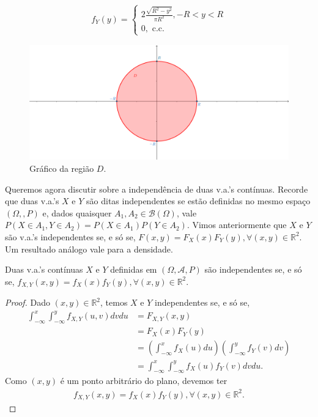 \documentclass[../Notas.tex]{subfiles}
\begin{document}
\begin{example}
\begin{align*}
    f_Y(y) = \begin{cases}
    2\frac{\sqrt{R^2 - y^2}}{\pi R^2}, -R < y < R \\
    0, \text{ c.c.}
    \end{cases}
\end{align*}
\begin{figure}[H]
    \centering
    \includegraphics[width=\textwidth]{Imagens/p121.png}
    \caption{Gráfico da região $D$.}
\end{figure}
\end{example}

Queremos agora discutir sobre a independência de duas v.a.'s contínuas. Recorde que duas v.a.'s $X$ e $Y$ são ditas independentes se estão definidas no mesmo espaço $(\Omega, \mathcal, P)$ e, dados quaisquer $A_1, A_2\in\mathcal{B}(\Omega)$, vale $P(X\in A_1, Y\in A_2) = P(X\in A_1)P(Y\in A_2)$. Vimos anteriormente que $X$ e $Y$ são v.a.'s independentes se, e só se, $F(x,y) = F_X(x)F_Y(y), \forall (x,y)\in\mathbb{R}^2$. Um resultado análogo vale para a densidade.
\begin{proposition}
Duas v.a.'s contínuas $X$ e $Y$ definidas em $(\Omega, \mathcal{A}, P)$ são independentes se, e só se, $f_{X,Y}(x,y) = f_X(x)f_Y(y), \forall (x,y)\in\mathbb{R}^2$.
\end{proposition}
\begin{proof}
Dado $(x,y)\in\mathbb{R}^2$, temos $X$ e $Y$ independentes se, e só se,
\begin{align*}
    \int_{-\infty}^{x}\int_{-\infty}^{y} f_{X,Y}(u,v) dvdu &= F_{X,Y}(x,y) \\
    &= F_X(x)F_Y(y) \\
    &= \left( \int_{-\infty}^{x} f_X(u) du \right)\left( \int_{-\infty}^{y} f_Y(v) dv \right) \\
    &= \int_{-\infty}^{x}\int_{-\infty}^{y} f_X(u)f_Y(v) dvdu.
\end{align*}
Como $(x,y)$ é um ponto arbitrário do plano, devemos ter
\begin{align*}
    f_{X,Y}(x,y) = f_X(x)f_Y(y), \forall (x,y)\in\mathbb{R}^2.
\end{align*}
\end{proof}
\end{document}
